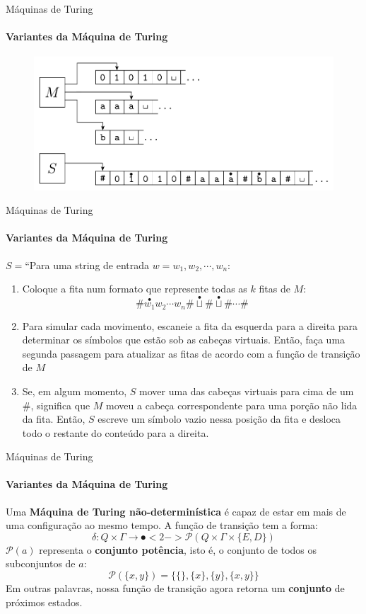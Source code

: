 \documentclass{beamer}
\begin{document}
\begin{frame}{Máquinas de Turing}
	\framesubtitle{Variantes da Máquina de Turing}
	\begin{figure}
		\includegraphics[width=0.9\paperwidth]{resources/multitape}
	\end{figure}
\end{frame}
\begin{frame}{Máquinas de Turing}
	\framesubtitle{Variantes da Máquina de Turing}
	$S = $``Para uma string de entrada $w = w_{1}, w_{2}, \cdots, w_{n}$:
	\begin{enumerate}
		\item Coloque a fita num formato que represente todas as $k$ fitas de $M$:
		\begin{equation*}
			\#\overset{\bullet}{w_{1}} w_{2} \cdots w_{n}\#\overset{\bullet}{\sqcup}\#\overset{\bullet}{\sqcup}\#\cdots\#
		\end{equation*}
		\item Para simular cada movimento, escaneie a fita da esquerda para a direita para determinar os símbolos que estão sob as cabeças virtuais. Então, faça uma segunda passagem para atualizar as fitas de acordo com a função de transição de $M$
		\item Se, em algum momento, $S$ mover uma das cabeças virtuais para cima de um \#, significa que $M$ moveu a cabeça correspondente para uma porção não lida da fita. Então, $S$ escreve um símbolo vazio nessa posição da fita e desloca todo o restante do conteúdo para a direita.
	\end{enumerate}
\end{frame}
\begin{frame}{Máquinas de Turing}
	\framesubtitle{Variantes da Máquina de Turing}
	Uma \textbf{Máquina de Turing não-determinística} é capaz de estar em mais de uma configuração ao mesmo tempo. A função de transição tem a forma:
	\begin{equation*}
		\delta: Q \times \Gamma \rightarrow \spot<2->{\mathscr{P}}(Q \times \Gamma \times \{E,D\})
	\end{equation*}
	\only<2-> {
		$\mathscr{P}(a)$ representa o \textbf{conjunto potência}, isto é, o conjunto de todos os subconjuntos de $a$:
		\begin{equation*}
			\mathscr{P}(\{x,y\}) = \{\{\}, \{x\}, \{y\}, \{x,y\}\}
		\end{equation*}
		Em outras palavras, nossa função de transição agora retorna um \textbf{conjunto} de próximos estados.
	}
\end{frame}
\end{document}
